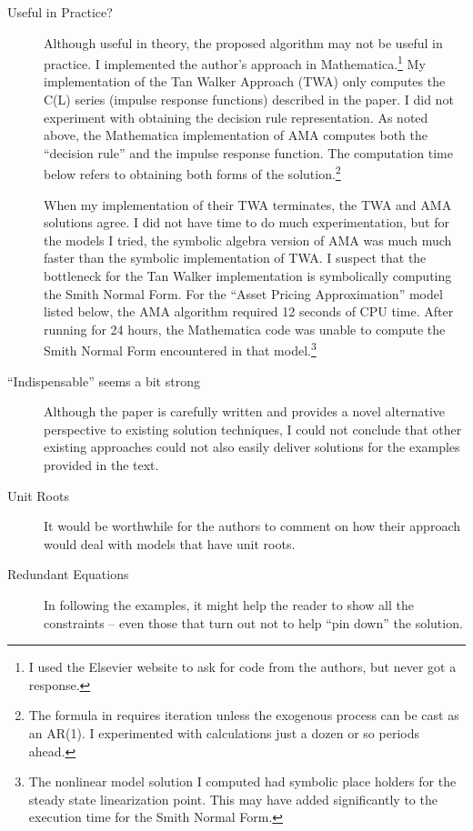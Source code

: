 \documentclass[12pt]{article}
\begin{document}
\begin{description}
\item[Useful in Practice?] Although useful in theory, the
proposed algorithm may not be useful in practice.
I implemented the author's approach in Mathematica.\footnote{I used the Elsevier website to ask for code from the authors, but never got a response.}
My implementation of the Tan Walker Approach (TWA)
only computes the C(L)  series  (impulse response functions) 
described in the paper.  I did not experiment with obtaining the decision
rule representation.
As noted above, the Mathematica implementation of AMA 
computes both the ``decision rule'' and the impulse
response function.  The computation time below refers to obtaining both
forms of the solution.\footnote{The formula in \cite{Anderson10} requires
iteration unless the exogenous process can be cast as an AR(1).  I experimented
with calculations just a dozen or so periods ahead.}

When my implementation of their TWA terminates, the TWA and AMA 
solutions agree.
I did not have time to do much experimentation, but for the models I tried,
the symbolic algebra version of AMA was much much faster than the 
symbolic implementation of TWA.
I suspect that the bottleneck for the Tan Walker implementation is 
symbolically computing the Smith Normal Form.  For the ``Asset Pricing Approximation'' model listed below,  the AMA algorithm required 12 seconds of CPU time.
After running for 24 hours, the Mathematica code 
was unable to compute the Smith Normal Form encountered
in that model.\footnote{ The nonlinear model solution I computed
had symbolic place holders for
the steady state linearization point. This may have added significantly to the
execution time for the Smith Normal Form.}


\item[``Indispensable'' seems a bit strong] Although the 
paper is carefully written and provides a novel alternative perspective
to existing solution techniques, I could not conclude that other existing
approaches could not also easily 
deliver solutions for the examples provided in the text.

\item[Unit Roots] It would be worthwhile for the authors 
to comment on how their approach would deal with models that have unit roots.

\item[Redundant Equations] In following the examples, 
it might help the reader to show  
all  the constraints -- even those that turn out not to help 
``pin down'' the solution.


\end{description}
\end{document}
